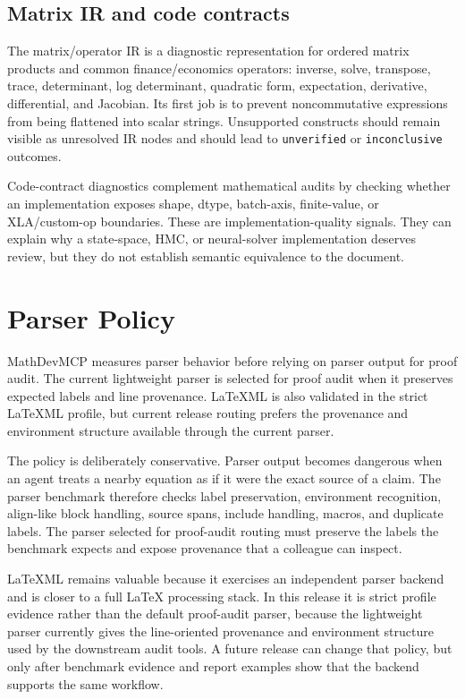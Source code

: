 \documentclass[12pt,a4paper,openany]{book}
\begin{document}
\section{Matrix IR and code contracts}

The matrix/operator IR is a diagnostic representation for ordered matrix
products and common finance/economics operators: inverse, solve, transpose,
trace, determinant, log determinant, quadratic form, expectation, derivative,
differential, and Jacobian. Its first job is to prevent noncommutative
expressions from being flattened into scalar strings. Unsupported constructs
should remain visible as unresolved IR nodes and should lead to
\texttt{unverified} or \texttt{inconclusive} outcomes.

Code-contract diagnostics complement mathematical audits by checking whether an
implementation exposes shape, dtype, batch-axis, finite-value, or XLA/custom-op
boundaries. These are implementation-quality signals. They can explain why a
state-space, HMC, or neural-solver implementation deserves review, but they do
not establish semantic equivalence to the document.

\chapter{Parser Policy}

MathDevMCP measures parser behavior before relying on parser output for proof
audit. The current lightweight parser is selected for proof audit when it
preserves expected labels and line provenance. LaTeXML is also validated in the
strict LaTeXML profile, but current release routing prefers the provenance and
environment structure available through the current parser.

The policy is deliberately conservative. Parser output becomes dangerous when an
agent treats a nearby equation as if it were the exact source of a claim. The
parser benchmark therefore checks label preservation, environment recognition,
align-like block handling, source spans, include handling, macros, and duplicate
labels. The parser selected for proof-audit routing must preserve the labels the
benchmark expects and expose provenance that a colleague can inspect.

LaTeXML remains valuable because it exercises an independent parser backend and
is closer to a full LaTeX processing stack. In this release it is strict profile
evidence rather than the default proof-audit parser, because the lightweight
parser currently gives the line-oriented provenance and environment structure
used by the downstream audit tools. A future release can change that policy, but
only after benchmark evidence and report examples show that the backend supports
the same workflow.
\end{document}
